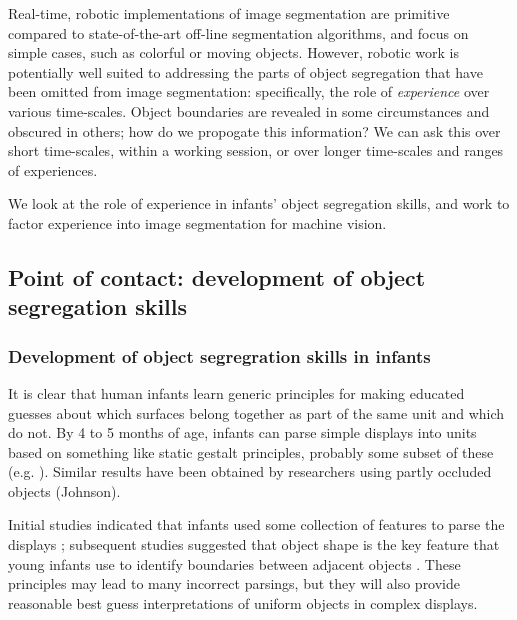 %
Real-time, robotic
implementations of image segmentation are primitive compared to
state-of-the-art off-line segmentation algorithms, and focus on simple
cases, such as colorful or moving objects.
%
However, robotic work is potentially well suited to addressing the
parts of object segregation that have been omitted from image
segmentation: specifically, the role of {\em experience} over
various time-scales.  Object boundaries are revealed in some
circumstances and obscured in others; how do we propogate this
information?  We can ask this over short time-scales, within
a working session, or over longer time-scales and ranges
of experiences.

We look at the role of experience in infants' object 
segregation skills, and work to factor experience into 
image segmentation for machine vision.


\subsection{Point of contact: development of object segregation skills}

\subsubsection*{Development of object segregration skills in infants}

It is clear that human infants learn generic principles for making
educated guesses about which surfaces belong together as part of the
same unit and which do not.  By 4 to 5 months of age, infants can
parse simple displays into units based on something like static
gestalt principles, probably some subset of these (e.g. ). 
%
Similar results have been obtained by researchers using partly
occluded objects (Johnson).

Initial studies indicated that infants used some collection of
features to parse the displays \cite{needham98infants,needham97object,needham98effects}; subsequent studies suggested that object shape is the key
feature that young infants use to identify boundaries between adjacent
objects \cite{needham99role}.
%
These principles may lead to many incorrect parsings, but they will
also provide reasonable best guess interpretations of uniform objects
in complex displays.  


